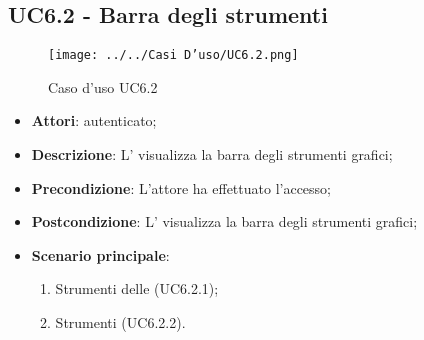 \subsection{UC6.2 - Barra degli strumenti}
\label{ssec:UC6.2}
\begin{figure}[h!]
\centering
\texttt{[image: ../../Casi D'uso/UC6.2.png]}
\caption{Caso d'uso UC6.2}
 \end{figure}
\begin{itemize}
\item \textbf{Attori}:  autenticato;
\item \textbf{Descrizione}: L' visualizza la barra degli strumenti grafici;
\item \textbf{Precondizione}: L'attore ha effettuato l'accesso;
\item \textbf{Postcondizione}: L' visualizza la barra degli strumenti grafici;
\item \textbf{Scenario principale}: \begin{enumerate}\item Strumenti delle  (UC6.2.1);\item Strumenti  (UC6.2.2).
 \end{enumerate}
\end{itemize}
\newpage
